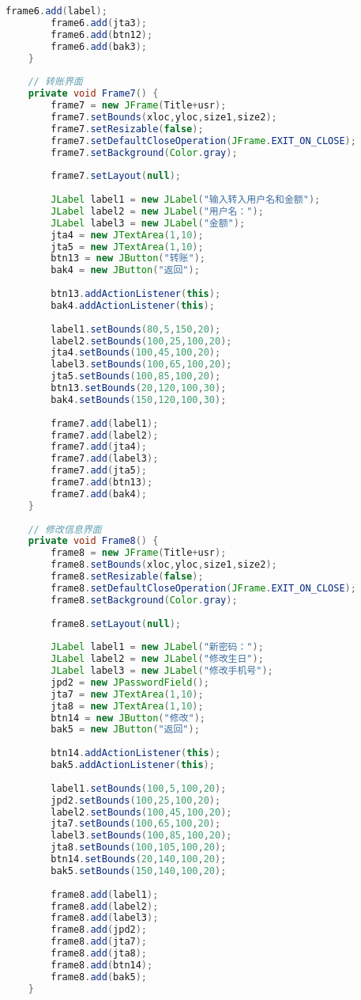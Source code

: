 \begin{lstlisting}[language = java, caption = UI.java]
		frame6.add(label);
		frame6.add(jta3);
		frame6.add(btn12);
		frame6.add(bak3);
	}
	
	// 转账界面
	private void Frame7() {
		frame7 = new JFrame(Title+usr);
		frame7.setBounds(xloc,yloc,size1,size2);
		frame7.setResizable(false);
		frame7.setDefaultCloseOperation(JFrame.EXIT_ON_CLOSE);
		frame7.setBackground(Color.gray);
		
		frame7.setLayout(null);
		
		JLabel label1 = new JLabel("输入转入用户名和金额");
		JLabel label2 = new JLabel("用户名：");
		JLabel label3 = new JLabel("金额");
		jta4 = new JTextArea(1,10);
		jta5 = new JTextArea(1,10);
		btn13 = new JButton("转账");
		bak4 = new JButton("返回");
		
		btn13.addActionListener(this);
		bak4.addActionListener(this);
		
		label1.setBounds(80,5,150,20);
		label2.setBounds(100,25,100,20);
		jta4.setBounds(100,45,100,20);
		label3.setBounds(100,65,100,20);
		jta5.setBounds(100,85,100,20);
		btn13.setBounds(20,120,100,30);
		bak4.setBounds(150,120,100,30);
		
		frame7.add(label1);
		frame7.add(label2);
		frame7.add(jta4);
		frame7.add(label3);
		frame7.add(jta5);
		frame7.add(btn13);
		frame7.add(bak4);
	}
	
	// 修改信息界面
	private void Frame8() {
		frame8 = new JFrame(Title+usr);
		frame8.setBounds(xloc,yloc,size1,size2);
		frame8.setResizable(false);
		frame8.setDefaultCloseOperation(JFrame.EXIT_ON_CLOSE);
		frame8.setBackground(Color.gray);
		
		frame8.setLayout(null);
		
		JLabel label1 = new JLabel("新密码：");
		JLabel label2 = new JLabel("修改生日");
		JLabel label3 = new JLabel("修改手机号");
		jpd2 = new JPasswordField();
		jta7 = new JTextArea(1,10);
		jta8 = new JTextArea(1,10);
		btn14 = new JButton("修改");
		bak5 = new JButton("返回");
		
		btn14.addActionListener(this);
		bak5.addActionListener(this);
		
		label1.setBounds(100,5,100,20);
		jpd2.setBounds(100,25,100,20);
		label2.setBounds(100,45,100,20);
		jta7.setBounds(100,65,100,20);
		label3.setBounds(100,85,100,20);
		jta8.setBounds(100,105,100,20);
		btn14.setBounds(20,140,100,20);
		bak5.setBounds(150,140,100,20);
		
		frame8.add(label1);
		frame8.add(label2);
		frame8.add(label3);
		frame8.add(jpd2);
		frame8.add(jta7);
		frame8.add(jta8);
		frame8.add(btn14);
		frame8.add(bak5);
	}
	

\end{lstlisting}
